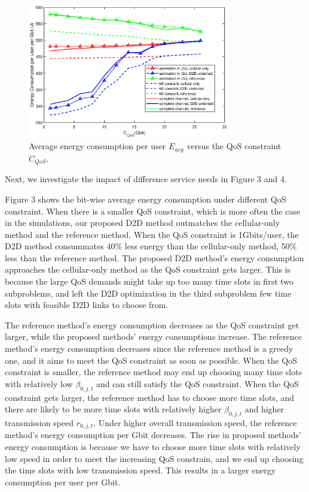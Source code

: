 \documentclass{ieeeaccess}
\begin{document}
\begin{figure} [htb]
\includegraphics*[width=8.8cm]{Cqos.eps}
\caption{Average energy consumption per user $E_{avg}$ versus the QoS constraint ${C_{QoS}}$.}\label{fig:3}
\end{figure}



Next, we investigate the impact of difference service needs in Figure 3 and 4. 

Figure 3 shows the bit-wise average energy consumption under different QoS constraint.
When there is a smaller QoS constraint, which is more often the case in the simulations, our proposed D2D method outmatches the cellular-only method and the reference method. When the QoS constraint is 1Gbits/user, the D2D method consummates 40\% less energy than the cellular-only method, 50\% less than the reference method. The proposed D2D method's energy consumption approaches the cellular-only method as the QoS constraint gets larger. This is because the large QoS demands might take up too many time slots in first two subproblems, and left the D2D optimization in the third subproblem few time slots with feasible D2D links to choose from.

The reference method's energy consumption decreases as the QoS constraint get larger, while the proposed methods' energy consumptions increase. The reference method's energy consumption decreases since the reference method is a greedy one, and it aims to meet the QoS constraint as soon as possible. When the QoS constraint is smaller, the reference method may end up choosing many time slots with relatively low ${\beta _{0,j,t}}$ and can still satisfy the QoS constraint. When the QoS constraint gets larger, the reference method has to choose more time slots, and there are likely to be more time slots with relatively higher ${\beta _{0,j,t}}$ and higher transmission speed ${r_{0,j,t}}$. Under higher overall transmission speed, the reference method's energy consumption per Gbit decreases. The rise in proposed methods' energy consumption is because we have to choose more time slots with relatively low speed in order to meet the increasing QoS constrain, and we end up choosing the time slots with low transmission speed. This results in a larger energy consumption per user per Gbit. 
\end{document}
